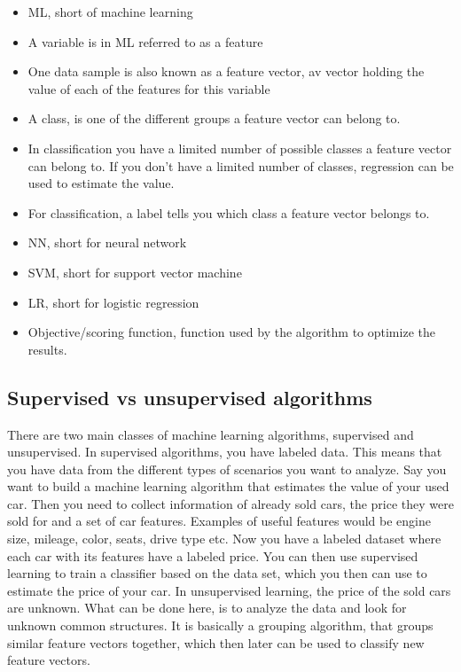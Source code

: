         \begin{itemize}
            \item ML, short of machine learning
            \item A variable is in ML referred to as a feature
            \item One data sample is also known as a feature vector, av vector holding the value of each of the features for this variable
            \item A class, is one of the different groups a feature vector can belong to.
            \item In classification you have a limited number of possible classes a feature vector can belong to. If you don't have a limited number of classes, regression  can be used to estimate the value.  
            \item For classification, a label tells you which class a feature vector belongs to.
            \item NN, short for neural network
            \item SVM, short for support vector machine
            \item LR, short for logistic regression
            \item Objective/scoring function, function used by the algorithm to optimize the results. 
        \end{itemize}
    
    \subsection{Supervised vs unsupervised algorithms}
        There are two main classes of machine learning algorithms, supervised and unsupervised. In supervised algorithms, you have labeled data. This means that you have data from the different types of scenarios you want to analyze. Say you want to build a machine learning algorithm that estimates the value of your used car. Then you need to collect information of already sold cars, the price they were sold for and a set of car features. Examples of useful features would be engine size, mileage, color, seats, drive type etc. Now you have a labeled dataset where each car with its features have a labeled price. You can then use supervised learning to train a classifier based on the data set, which you then can use to estimate the price of your car. In unsupervised learning, the price of the sold cars are unknown. What can be done here, is to analyze the data and look for unknown common structures. It is basically a grouping algorithm, that groups similar feature vectors together, which then later can be used to classify new feature vectors. 
        
